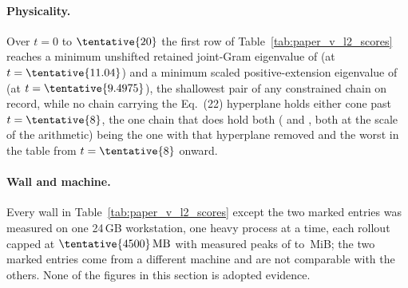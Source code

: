 \paragraph*{Physicality.}
Over \(t=0\) to \(\tentative{20}\) the first row of
Table~\ref{tab:paper_v_l2_scores} reaches a minimum unshifted retained
joint-Gram eigenvalue of  (at
\(t=\tentative{11.04}\)) and a minimum scaled positive-extension eigenvalue of
 (at \(t=\tentative{9.4975}\)), the
shallowest pair of any constrained chain on record, while no chain carrying
the Eq.~(22) hyperplane holds either cone past \(t=\tentative{8}\), the one
chain that does hold both ( and
, both at the scale of the arithmetic) being
the one with that hyperplane removed and the worst in the table from
\(t=\tentative{8}\) onward.

\paragraph*{Wall and machine.}
Every wall in Table~\ref{tab:paper_v_l2_scores} except the two marked entries
was measured on one 24\,GB workstation, one heavy process at a time, each
rollout capped at \(\tentative{4500}\,\mathrm{MB}\) with measured peaks of
 to \,MiB; the two marked entries come
from a different machine and are not comparable with the others.  None of the
figures in this section is adopted evidence.



